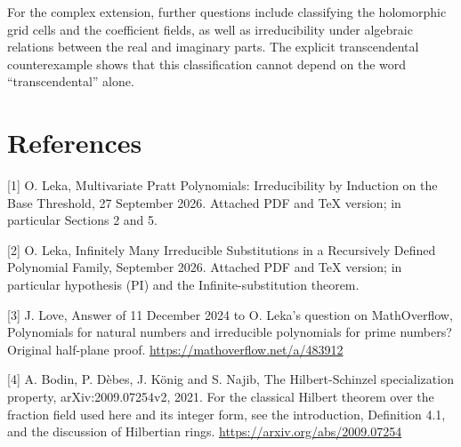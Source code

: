 \documentclass[11pt,a4paper]{article}
\begin{document}
For the complex extension, further questions include classifying the holomorphic grid cells and the coefficient fields, as well as irreducibility under algebraic relations between the real and imaginary parts. The explicit transcendental counterexample shows that this classification cannot depend on the word “transcendental” alone.


\clearpage

\section*{References}

[1] O. Leka, Multivariate Pratt Polynomials: Irreducibility by Induction on the Base Threshold, 27 September 2026. Attached PDF and TeX version; in particular Sections 2 and 5.


[2] O. Leka, Infinitely Many Irreducible Substitutions in a Recursively Defined Polynomial Family, September 2026. Attached PDF and TeX version; in particular hypothesis (PI) and the Infinite-substitution theorem.


[3] J. Love, Answer of 11 December 2024 to O. Leka's question on MathOverflow, Polynomials for natural numbers and irreducible polynomials for prime numbers? Original half-plane proof. \url{https://mathoverflow.net/a/483912}


[4] A. Bodin, P. Dèbes, J. König and S. Najib, The Hilbert-Schinzel specialization property, arXiv:2009.07254v2, 2021. For the classical Hilbert theorem over the fraction field used here and its integer form, see the introduction, Definition 4.1, and the discussion of Hilbertian rings. \url{https://arxiv.org/abs/2009.07254}
\end{document}
